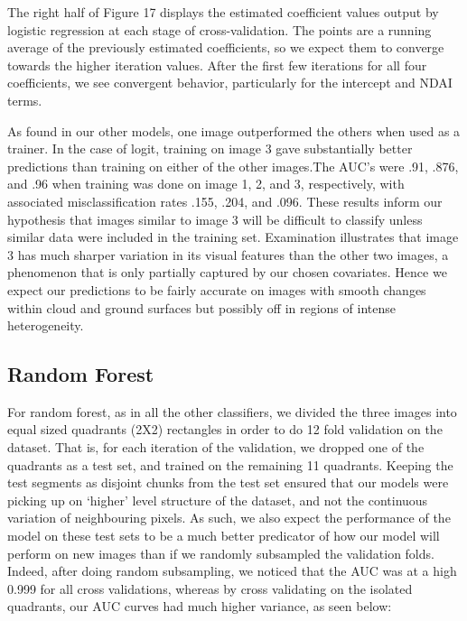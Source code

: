 \documentclass{article}\usepackage[]{graphicx}\usepackage[]{color}
\begin{document}
The right half of Figure 17 displays the estimated coefficient values output by logistic regression at each stage of cross-validation. The points are a running average of the previously estimated coefficients, so we expect them to converge towards the higher iteration values. After the first few iterations for all four coefficients, we see convergent behavior, particularly for the intercept and NDAI terms. 

As found in our other models, one image outperformed the others when used as a trainer. In the case of logit, training on image 3 gave substantially better predictions than training on either of the other images.The AUC's were .91, .876, and .96 when training was done on image 1, 2, and 3, respectively, with associated misclassification rates .155, .204, and .096. These results inform our hypothesis that images similar to image 3 will be difficult to classify unless similar data were included in the training set. Examination illustrates that image 3 has much sharper variation in its visual features than the other two images, a phenomenon that is only partially captured by our chosen covariates. Hence we expect our predictions to be fairly accurate on images with smooth changes within cloud and ground surfaces but possibly off in regions of intense heterogeneity.

\subsection{Random Forest}

For random forest, as in all the other classifiers, we divided the three images into equal sized quadrants (2X2) rectangles in order to do 12 fold validation on the dataset.  That is, for each iteration of the validation, we dropped one of the quadrants as a test set, and trained on the remaining 11 quadrants.  Keeping the test segments as disjoint chunks from the test set ensured that our models were picking up on `higher' level structure of the dataset, and not the continuous variation of neighbouring pixels.  As such, we also expect the performance of the model on these test sets to be a much better predicator of how our model will perform on new images than if we randomly subsampled the validation folds.  Indeed, after doing random subsampling, we noticed that the AUC was at a high 0.999 for all cross validations, whereas by cross validating on the isolated quadrants, our AUC curves had much higher variance, as seen below: \\
\end{document}
